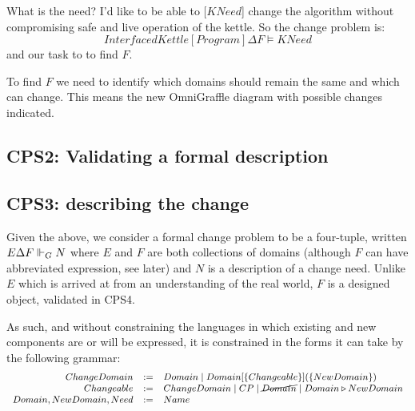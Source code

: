 \documentclass[runningheads,a4paper]{llncs}
\begin{document}

What is the need? I'd like to be able to [$KNeed$] change the algorithm without compromising safe and live operation of the kettle. So the change problem is:
%
\[InterfacedKettle[Program]\Delta F\models KNeed\]
%
and our task to to find $F$.

To find $F$ we need to identify which domains should remain the same and which can change. This means the new OmniGraffle diagram with possible changes indicated.

\subsection{CPS2: Validating a formal description}


\subsection{CPS3: describing the change}

\newcommand{\replacedBy}{\triangleright}

Given the above, we consider a formal change problem to be a four-tuple, written $E\Delta F\Vdash_G N$ where $E$ and $F$ are both collections of domains (although $F$ can have abbreviated expression, see later) and $N$ is a description of a change need. Unlike $E$ which is arrived at from an understanding of the real world, $F$ is a designed object, validated in CPS4.


As such, and without constraining the languages in which existing and new components are or will be expressed, it is constrained in the forms it can take by the following grammar:
%
\[\footnotesize\begin{array}{rcll}
                 ChangeDomain &:=& Domain \mid Domain[\{Changeable\}](\{NewDomain\})\\
                 Changeable &:=& ChangeDomain \mid CP \mid \cancel{Domain} \mid Domain \replacedBy NewDomain\\
                 Domain, NewDomain, Need &:=& Name
               \end{array}\]
               
\end{document}
